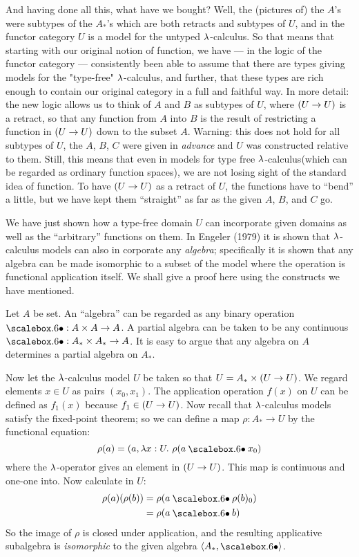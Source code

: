And having done all this, what have we bought? Well, the (pictures of) the $A$'s were subtypes of the $A_*$'s which are both retracts and subtypes of $U$, and in the functor category $U$ is a model for the untyped $\lambda$-calculus. So that means that starting with our original notion of function, we have --- in the logic of the functor category --- consistently been able to assume that there are types giving models for the "type-free" $\lambda$-calculus,
and further, that these types are rich enough to contain our original category in a full and faithful way. In more detail: the new logic allows us to think of $A$ and $B$ as subtypes of $U$, where $(U\rightarrow U)$ is a retract, so that any function from $A$ into $B$ is the result of restricting a function in $(U\rightarrow U)$ down to the subset $A$. Warning: this does not hold for all subtypes of $U$, the $A$, $B$, $C$ were given in {\it advance} and $U$ was constructed rela­tive to them. Still, this means that even in models for type­ free $\lambda$-calculus(which can be regarded as ordinary function spaces), we are not losing sight of the standard idea of func­tion. To have $(U\rightarrow U)$ as a retract of $U$, the functions have to ``bend'' a little, but we have kept them ``straight'' as far as the given $A$, $B$, and $C$ go.

We have just shown how a type-free domain $U$ can incorporate given domains as well as the ``arbitrary'' functions on them. In Engeler (1979) it is shown that $\lambda$-calculus models can also in­ corporate any {\it algebra}; specifically it is shown that any alge­bra can be made isomorphic to a subset of the model where the operation is functional application itself. We shall give a proof here using the constructs we have mentioned.

Let $A$ be set. An ``algebra'' can be regarded as any binary operation $\dotop : A\times A\to A$. 
A partial algebra can be taken to be any continuous $\dotop : A_* \times A_* \to A$.
It is easy to argue that any algebra on $A$ determines a partial algebra on $A_*$.

Now let the $\lambda$-calculus model $U$ be taken so that
$U = A_* \times  (U\rightarrow U)$. We regard elements $x \in U$ as pairs $(x_0 , x_1 )$.
The application operation $f(x)$ on $U$ can be defined as $f_1(x)$ be­cause $f_1 \in (U\rightarrow U)$. Now recall that $\lambda$-calculus models satisfy
the fixed-point theorem; so we can define a map $\rho: A_*\to U$ by the functional equation:
$$
\rho(a)  =  (a, \l x: U. \,\,\rho (a \dotop x_0)
$$
where the $\lambda$-operator gives an element in $(U\rightarrow U)$. This map is continuous and one-one into. Now calculate in $U$:
\begin{align*}
\rho(a)(\rho(b)) &= \rho(a\dotop \rho(b)_0)\\
&= \rho( a  \dotop  b)
\end{align*}
So the image of $\rho$ is closed under application, and the result­ing applicative subalgebra is {\it isomorphic} to the given algebra
$\langle A_*, \dotop \rangle$. 

